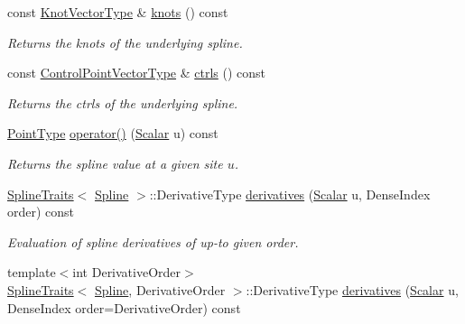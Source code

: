 \begin{DoxyCompactItemize}
const \hyperlink{group___splines___module_a066f7a8b120316c9068b559f0790e9ec}{Knot\+Vector\+Type} \& \hyperlink{group___splines___module_ae3eac8af580ad880d8ad3a259d453aa1}{knots} () const
\begin{DoxyCompactList}\small\item\em Returns the knots of the underlying spline. \end{DoxyCompactList}\item 
\mbox{\label{group___splines___module_a0fc81e475d3a0ba34da1bd97f2e8fbc7}} 
const \hyperlink{group___splines___module_ac42c673462a98ad1779761bebeb450bf}{Control\+Point\+Vector\+Type} \& \hyperlink{group___splines___module_a0fc81e475d3a0ba34da1bd97f2e8fbc7}{ctrls} () const
\begin{DoxyCompactList}\small\item\em Returns the ctrls of the underlying spline. \end{DoxyCompactList}\item 
\hyperlink{group___splines___module_a9ade8a2f81dae6eedb8845cb080672bd}{Point\+Type} \hyperlink{group___splines___module_a03058a40af2af81e1ed179d45105b026}{operator()} (\hyperlink{group___splines___module_a8cafd78b564825c76fbb3419653d9742}{Scalar} u) const
\begin{DoxyCompactList}\small\item\em Returns the spline value at a given site $u$. \end{DoxyCompactList}\item 
\hyperlink{struct_eigen_1_1_spline_traits}{Spline\+Traits}$<$ \hyperlink{group___splines___module_class_eigen_1_1_spline}{Spline} $>$\+::Derivative\+Type \hyperlink{group___splines___module_adb27e36696b851a855d7a34cdedc9a66}{derivatives} (\hyperlink{group___splines___module_a8cafd78b564825c76fbb3419653d9742}{Scalar} u, Dense\+Index order) const
\begin{DoxyCompactList}\small\item\em Evaluation of spline derivatives of up-\/to given order. \end{DoxyCompactList}\item 
{\footnotesize template$<$int Derivative\+Order$>$ }\\\hyperlink{struct_eigen_1_1_spline_traits}{Spline\+Traits}$<$ \hyperlink{group___splines___module_class_eigen_1_1_spline}{Spline}, Derivative\+Order $>$\+::Derivative\+Type \hyperlink{group___splines___module_a50bcf6c99a95ecab7c475f3ab503ee22}{derivatives} (\hyperlink{group___splines___module_a8cafd78b564825c76fbb3419653d9742}{Scalar} u, Dense\+Index order=Derivative\+Order) const

\end{DoxyCompactItemize}

